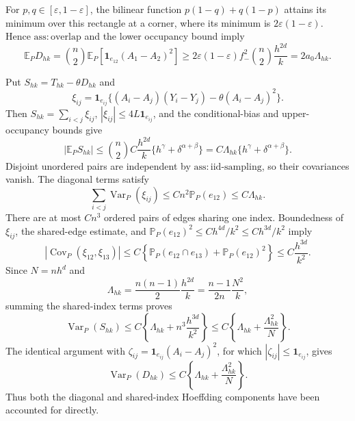 For \(p,q\in[\varepsilon,1-\varepsilon]\), the bilinear function
\(p(1-q)+q(1-p)\) attains its minimum over this rectangle at a corner, where its minimum is \(2\varepsilon(1-\varepsilon)\).  Hence \(\mathrm{ass:overlap}\) and the lower occupancy bound imply
\[
 \mathbb E_P D_{hk}
 =\binom n2\mathbb E_P\left[\mathbf 1_{e_{12}}(A_1-A_2)^2\right]
 \geq2\varepsilon(1-\varepsilon)f_{-}^2\binom n2\frac{h^{2d}}{k}
 =2a_0\Lambda_{hk}.
\]

Put \(S_{hk}=T_{hk}-\theta D_{hk}\) and
\[
 \xi_{ij}=\mathbf 1_{e_{ij}}\bigl\{(A_i-A_j)(Y_i-Y_j)-\theta(A_i-A_j)^2\bigr\}.
\]
Then \(S_{hk}=\sum_{i<j}\xi_{ij}\), \(|\xi_{ij}|\leq4L\mathbf 1_{e_{ij}}\), and the conditional-bias and upper-occupancy bounds give
\[
 |\mathbb E_P S_{hk}|
 \leq\binom n2 C\frac{h^{2d}}{k}\{h^\gamma+\delta^{\alpha+\beta}\}
 =C\Lambda_{hk}\{h^\gamma+\delta^{\alpha+\beta}\}.
\]
Disjoint unordered pairs are independent by \(\mathrm{ass:iid\mbox{-}sampling}\), so their covariances vanish.  The diagonal terms satisfy
\[
 \sum_{i<j}\operatorname{Var}_P(\xi_{ij})
 \leq Cn^2\mathbb P_P(e_{12})
 \leq C\Lambda_{hk}.
\]
There are at most \(Cn^3\) ordered pairs of edges sharing one index.  Boundedness of \(\xi_{ij}\), the shared-edge estimate, and
\(\mathbb P_P(e_{12})^2\leq C h^{4d}/k^2\leq C h^{3d}/k^2\) imply
\[
 \left|\operatorname{Cov}_P(\xi_{12},\xi_{13})\right|
 \leq C\left\{\mathbb P_P(e_{12}\cap e_{13})+\mathbb P_P(e_{12})^2\right\}
 \leq C\frac{h^{3d}}{k^2}.
\]
Since \(N=nh^d\) and
\[
 \Lambda_{hk}=\frac{n(n-1)}{2}\frac{h^{2d}}{k}
 =\frac{n-1}{2n}\frac{N^2}{k},
\]
summing the shared-index terms proves
\[
 \operatorname{Var}_P(S_{hk})
 \leq C\left\{\Lambda_{hk}+n^3\frac{h^{3d}}{k^2}\right\}
 \leq C\left\{\Lambda_{hk}+\frac{\Lambda_{hk}^2}{N}\right\}.
\]
The identical argument with
\(\zeta_{ij}=\mathbf 1_{e_{ij}}(A_i-A_j)^2\), for which \(|\zeta_{ij}|\leq\mathbf 1_{e_{ij}}\), gives
\[
 \operatorname{Var}_P(D_{hk})
 \leq C\left\{\Lambda_{hk}+\frac{\Lambda_{hk}^2}{N}\right\}.
\]
Thus both the diagonal and shared-index Hoeffding components have been accounted for directly.

